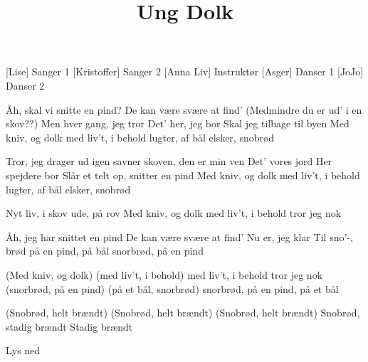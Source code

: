 \documentclass[a4paper,11pt]{article}
\title{Ung Dolk}
\begin{document}
\maketitle

\begin{roles}

[Lise] Sanger 1
[Kristoffer] Sanger 2
[Anna Liv] Instruktør
[Asger] Danser 1
[JoJo] Danser 2

\end{roles}

\begin{props}
\end{props}

\begin{song}

Åh, skal vi snitte en pind?
De kan være svære at find' (Medmindre du er ud' i en skov??)
Men hver gang, jeg tror
Det' her, jeg bor
Skal jeg tilbage til byen
Med kniv, og dolk
med liv't, i behold
lugter, af bål
elsker, snobrød

Tror, jeg drager ud igen
savner skoven, den er min ven
Det' vores jord
Her spejdere bor
Slår et telt op, snitter en pind
Med kniv, og dolk
med liv't, i behold
lugter, af bål
elsker, snobrød

Nyt liv, i skov
ude, på rov
Med kniv, og dolk
med liv't, i behold
tror jeg nok

Åh, jeg har snittet en pind
De kan være svære at find'
Nu er, jeg klar
Til sno'-, brød på
en pind, på bål
snorbrød, på en pind

(Med kniv, og dolk)
(med liv't, i behold)
med liv't, i behold
tror jeg nok
(snorbrød, på en pind)
(på et bål, snorbrød)
snorbrød, på en pind, 
på et bål

(Snobrød, helt brændt)
(Snobrød, helt brændt)
(Snobrød, helt brændt)
Snobrød, stadig brændt
Stadig brændt

\scene Lys ned
\end{song}
\end{document}
